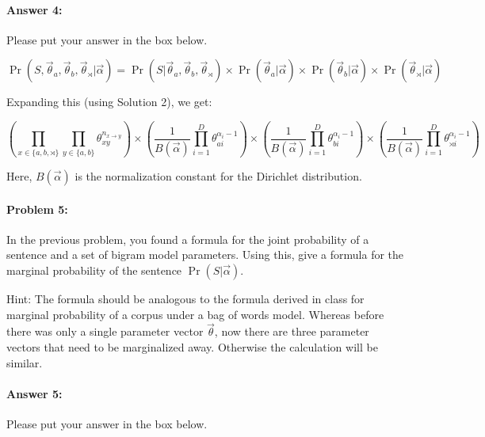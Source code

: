\documentclass[10pt]{article}
\newenvironment{AnswerBox}{\begin{mdframed}[style=simple]}{\end{mdframed}}
\begin{document}
\paragraph{Answer 4:} Please put your answer in the box below.


\begin{AnswerBox}%

    \[
    \Pr(S, \vec{\theta}_{a}, \vec{\theta}_{b}, \vec{\theta}_{\rtimes} | \vec{\alpha}) = \Pr(S | \vec{\theta}_{a}, \vec{\theta}_{b}, \vec{\theta}_{\rtimes}) \times \Pr(\vec{\theta}_{a} | \vec{\alpha}) \times \Pr(\vec{\theta}_{b} | \vec{\alpha}) \times \Pr(\vec{\theta}_{\rtimes} | \vec{\alpha})
    \]

    Expanding this (using Solution 2), we get:

    \[
        \left( \prod_{x \in \{a, b, \rtimes\}} \prod_{y \in \{a, b\}} \theta_{xy}^{n_{x \rightarrow y}} \right) \times \left( \frac{1}{B(\vec{\alpha})} \prod_{i=1}^{D} \theta_{ai}^{\alpha_{i} - 1} \right) \times \left( \frac{1}{B(\vec{\alpha})} \prod_{i=1}^{D} \theta_{bi}^{\alpha_{i} - 1} \right) \times \left( \frac{1}{B(\vec{\alpha})} \prod_{i=1}^{D} \theta_{\rtimes i}^{\alpha_{i} - 1} \right)
    \]

    Here, \( B(\vec{\alpha}) \) is the normalization constant for the Dirichlet distribution.
    
\end{AnswerBox}%


\hrulefill %

\paragraph{Problem 5:}

In the previous problem, you found a formula for the joint probability
of a sentence and a set of bigram model parameters. Using this, give a
formula for the marginal probability of the sentence
$\Pr(S|\vec{\alpha})$.

 Hint: The formula should be analogous to the formula derived
in class for marginal probability of a corpus under a bag of words
model. Whereas before there was only a single parameter vector
$\vec{\theta}$, now there are three parameter vectors that need to be
marginalized away. Otherwise the calculation will be similar.

\paragraph{Answer 5:} Please put your answer in the box below.
\end{document}

